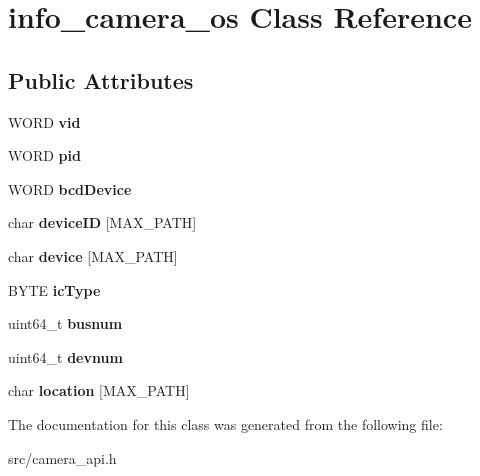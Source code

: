 \hypertarget{classinfo__camera__os}{}\section{info\+\_\+camera\+\_\+os Class Reference}
\label{classinfo__camera__os}
\subsection*{Public Attributes}
\begin{DoxyCompactItemize}
\item 
\mbox{\label{classinfo__camera__os_a3cda29196c1943c0312f89220c635872}} 
W\+O\+RD {\bfseries vid}
\item 
\mbox{\label{classinfo__camera__os_a939af1154643fade0a13b89640955244}} 
W\+O\+RD {\bfseries pid}
\item 
\mbox{\label{classinfo__camera__os_a5634876a9841ff0a903a06e224213287}} 
W\+O\+RD {\bfseries bcd\+Device}
\item 
\mbox{\label{classinfo__camera__os_a9e417bafcff3ee428bfdf2510047dd80}} 
char {\bfseries device\+ID} \mbox{[}M\+A\+X\+\_\+\+P\+A\+TH\mbox{]}
\item 
\mbox{\label{classinfo__camera__os_a47c4e49f8d85be806ad67a052330483f}} 
char {\bfseries device} \mbox{[}M\+A\+X\+\_\+\+P\+A\+TH\mbox{]}
\item 
\mbox{\label{classinfo__camera__os_a18e02e7605102fc883644a840c4d000d}} 
B\+Y\+TE {\bfseries ic\+Type}
\item 
\mbox{\label{classinfo__camera__os_a85043a073c9215c6957c2df585d8fcb2}} 
uint64\+\_\+t {\bfseries busnum}
\item 
\mbox{\label{classinfo__camera__os_ae82dc3a3a9af8c1b0a6c10b3ac2415bf}} 
uint64\+\_\+t {\bfseries devnum}
\item 
\mbox{\label{classinfo__camera__os_a37e158cee8c551ed73bb67c7647dfed9}} 
char {\bfseries location} \mbox{[}M\+A\+X\+\_\+\+P\+A\+TH\mbox{]}
\end{DoxyCompactItemize}


The documentation for this class was generated from the following file\+:\begin{DoxyCompactItemize}
\item 
src/camera\+\_\+api.\+h\end{DoxyCompactItemize}
